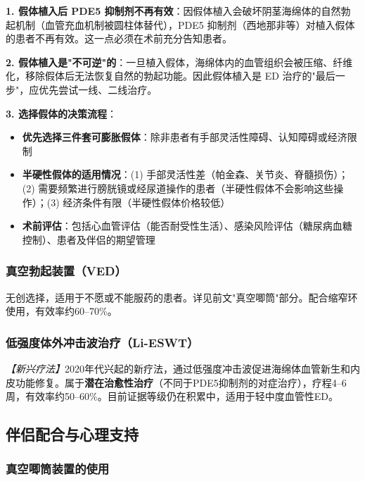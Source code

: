 \begin{tcolorbox}[colback=pink!5!white,colframe=red!50!black,title=贴心小叮咛]
\textbf{1. 假体植入后 PDE5 抑制剂不再有效}：因假体植入会破坏阴茎海绵体的自然勃起机制（血管充血机制被圆柱体替代），PDE5 抑制剂（西地那非等）对植入假体的患者不再有效。这一点必须在术前充分告知患者。

\textbf{2. 假体植入是"不可逆"的}：一旦植入假体，海绵体内的血管组织会被压缩、纤维化，移除假体后无法恢复自然的勃起功能。因此假体植入是 ED 治疗的"最后一步"，应优先尝试一线、二线治疗。

\textbf{3. 选择假体的决策流程}：
\begin{itemize}
	\item \textbf{优先选择三件套可膨胀假体}：除非患者有手部灵活性障碍、认知障碍或经济限制
	\item \textbf{半硬性假体的适用情况}：(1) 手部灵活性差（帕金森、关节炎、脊髓损伤）；(2) 需要频繁进行膀胱镜或经尿道操作的患者（半硬性假体不会影响这些操作）；(3) 经济条件有限（半硬性假体价格较低）
	\item \textbf{术前评估}：包括心血管评估（能否耐受性生活）、感染风险评估（糖尿病血糖控制）、患者及伴侣的期望管理
\end{itemize}
\end{tcolorbox}

\subsubsection{真空勃起装置（VED）}

无创选择，适用于不愿或不能服药的患者。详见前文"真空唧筒"部分。配合缩窄环使用，有效率约60--70\%。

\subsubsection{低强度体外冲击波治疗（Li-ESWT）}

\textit{【新兴疗法】}2020年代兴起的新疗法，通过低强度冲击波促进海绵体血管新生和内皮功能修复。属于\textbf{潜在治愈性治疗}（不同于PDE5抑制剂的对症治疗），疗程4--6周，有效率约50--60\%。目前证据等级仍在积累中，适用于轻中度血管性ED。

\subsection{伴侣配合与心理支持}

\subsubsection{真空唧筒装置的使用}

